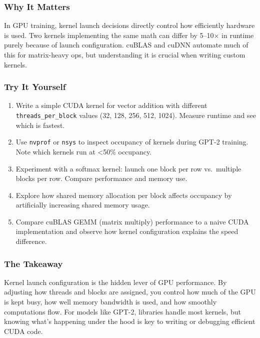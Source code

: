 \documentclass[
  letterpaper,
  DIV=11,
  numbers=noendperiod]{scrreprt}
\providecommand{\tightlist}{%
  \setlength{\itemsep}{0pt}\setlength{\parskip}{0pt}}
\begin{document}
\subsubsection{Why It Matters}\label{why-it-matters-44}

In GPU training, kernel launch decisions directly control how
efficiently hardware is used. Two kernels implementing the same math can
differ by 5--10× in runtime purely because of launch configuration.
cuBLAS and cuDNN automate much of this for matrix-heavy ops, but
understanding it is crucial when writing custom kernels.

\subsubsection{Try It Yourself}\label{try-it-yourself-56}

\begin{enumerate}
\def\labelenumi{\arabic{enumi}.}
\tightlist
\item
  Write a simple CUDA kernel for vector addition with different
  \texttt{threads\_per\_block} values (32, 128, 256, 512, 1024). Measure
  runtime and see which is fastest.
\item
  Use \texttt{nvprof} or \texttt{nsys} to inspect occupancy of kernels
  during GPT-2 training. Note which kernels run at \textless50\%
  occupancy.
\item
  Experiment with a softmax kernel: launch one block per row
  vs.~multiple blocks per row. Compare performance and memory use.
\item
  Explore how shared memory allocation per block affects occupancy by
  artificially increasing shared memory usage.
\item
  Compare cuBLAS GEMM (matrix multiply) performance to a naive CUDA
  implementation and observe how kernel configuration explains the speed
  difference.
\end{enumerate}

\subsubsection{The Takeaway}\label{the-takeaway-57}

Kernel launch configuration is the hidden lever of GPU performance. By
adjusting how threads and blocks are assigned, you control how much of
the GPU is kept busy, how well memory bandwidth is used, and how
smoothly computations flow. For models like GPT-2, libraries handle most
kernels, but knowing what's happening under the hood is key to writing
or debugging efficient CUDA code.
\end{document}
